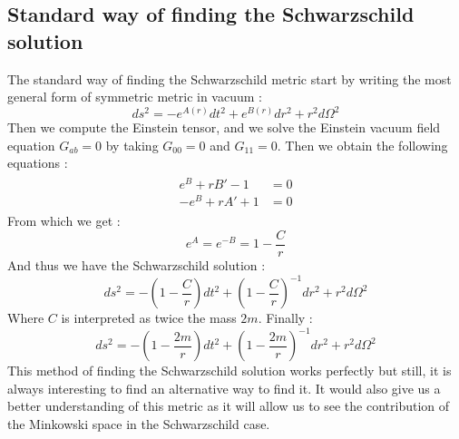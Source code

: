 \documentclass[a4paper,12pt]{article}
\theoremstyle{definition}
\begin{document}
\subsection{Standard way of finding the Schwarzschild solution}
The standard way of finding the Schwarzschild metric start by writing the most general form of symmetric metric in vacuum :
\begin{equation}
	ds^2=-e^{A(r)}dt^2+e^{B(r)}dr^2+r^2d\Omega^2
\end{equation}
Then we compute the Einstein tensor, and we solve the Einstein vacuum field equation $G_{ab}=0$ by taking $G_{00}=0$ and $G_{11}=0$.
Then we obtain the following equations :
\begin{align}
\begin{split}
	e^B+rB'-1&=0\\
	-e^B+rA'+1&=0
\end{split}
\end{align}
From which we get :
\begin{equation}
	e^A=e^{-B}=1-\frac{C}{r}
\end{equation}
And thus we have the Schwarzschild solution :
\begin{equation}
	ds^2=-(1-\frac{C}{r})dt^2+(1-\frac{C}{r})^{-1}dr^2+r^2d\Omega^2
\end{equation}
Where $C$ is interpreted as twice the mass $2m$.
Finally :
\begin{equation}
	ds^2=-(1-\frac{2m}{r})dt^2+(1-\frac{2m}{r})^{-1}dr^2+r^2d\Omega^2
\end{equation}
This method of finding the Schwarzschild solution works perfectly but still, it is always interesting to find an alternative way to find it.
It would also give us a better understanding of this metric as it will allow us to see the contribution of the Minkowski space in the Schwarzschild case.
\end{document}
